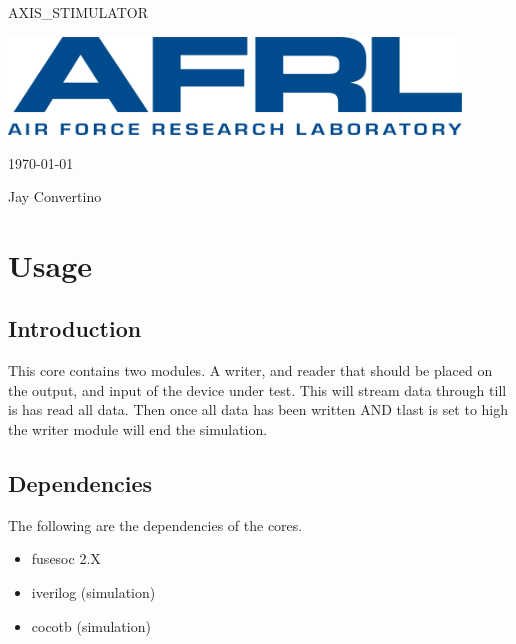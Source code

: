 \begin{titlepage}
  \begin{center}

  {\Huge AXIS\_STIMULATOR}

  \vspace{25mm}

  \includegraphics[width=0.90\textwidth,height=\textheight,keepaspectratio]{img/AFRL.png}

  \vspace{25mm}

  \today

  \vspace{15mm}

  {\Large Jay Convertino}

  \end{center}
\end{titlepage}

\tableofcontents

\newpage

\section{Usage}

\subsection{Introduction}

\par
This core contains two modules. A writer, and reader that should be placed on the
output, and input of the device under test. This will stream data through till
is has read all data. Then once all data has been written AND tlast is set to high
the writer module will end the simulation.

\subsection{Dependencies}

\par
The following are the dependencies of the cores.

\begin{itemize}
  \item fusesoc 2.X
  \item iverilog (simulation)
  \item cocotb (simulation)
\end{itemize}

